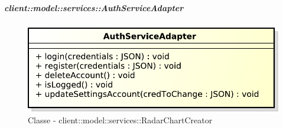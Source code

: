 		\subparagraph{client::model::services::AuthServiceAdapter} %
		\label{subp:client_model_services_authservice}
		\begin{figure}[htbp]
				\centering
				\centerline{\includegraphics[scale=0.7]{./images/client/classes/model/auth_service_adapter.pdf}}
				\caption{Classe - client::model::services::RadarChartCreator}
			\end{figure}
